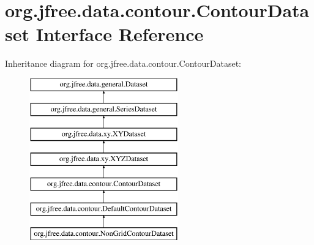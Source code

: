 \hypertarget{interfaceorg_1_1jfree_1_1data_1_1contour_1_1_contour_dataset}{}\section{org.\+jfree.\+data.\+contour.\+Contour\+Dataset Interface Reference}
\label{interfaceorg_1_1jfree_1_1data_1_1contour_1_1_contour_dataset}
Inheritance diagram for org.\+jfree.\+data.\+contour.\+Contour\+Dataset\+:\begin{figure}[H]
\begin{center}
\leavevmode
\includegraphics[height=7.000000cm]{interfaceorg_1_1jfree_1_1data_1_1contour_1_1_contour_dataset}
\end{center}
\end{figure}
